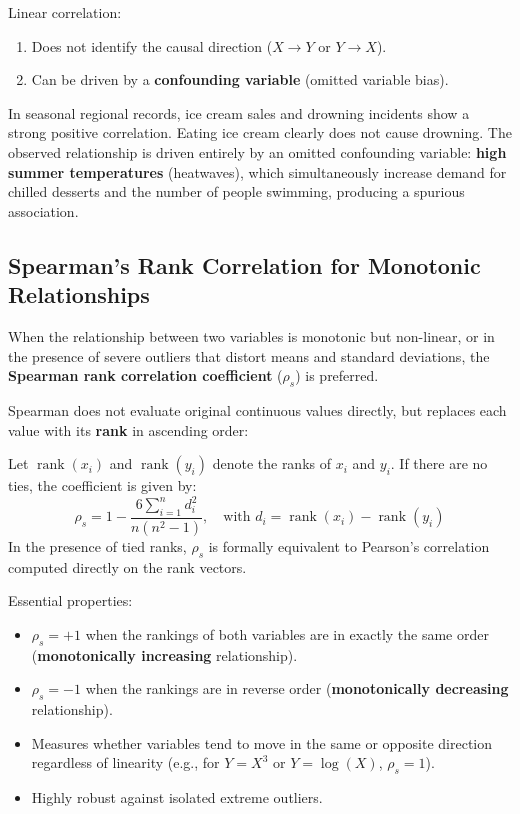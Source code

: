 Linear correlation:
\begin{enumerate}
    \item Does not identify the causal direction ($X \to Y$ or $Y \to X$).
    \item Can be driven by a \textbf{confounding variable} (omitted variable bias).
\end{enumerate}

\begin{example}
In seasonal regional records, ice cream sales and drowning incidents show a strong positive correlation. Eating ice cream clearly does not cause drowning. The observed relationship is driven entirely by an omitted confounding variable: \textbf{high summer temperatures} (heatwaves), which simultaneously increase demand for chilled desserts and the number of people swimming, producing a spurious association.
\end{example}

\subsection{Spearman's Rank Correlation for Monotonic Relationships}
When the relationship between two variables is monotonic but non-linear, or in the presence of severe outliers that distort means and standard deviations, the \textbf{Spearman rank correlation coefficient} ($\rho_s$) is preferred.

Spearman does not evaluate original continuous values directly, but replaces each value with its \textbf{rank} in ascending order:

\begin{definition}
Let $\operatorname{rank}(x_i)$ and $\operatorname{rank}(y_i)$ denote the ranks of $x_i$ and $y_i$. If there are no ties, the coefficient is given by:
\begin{equation}
\rho_s = 1 - \frac{6 \sum_{i=1}^n d_i^2}{n(n^2 - 1)}, \quad \text{with } d_i = \operatorname{rank}(x_i) - \operatorname{rank}(y_i)
\end{equation}
In the presence of tied ranks, $\rho_s$ is formally equivalent to Pearson's correlation computed directly on the rank vectors.
\end{definition}

Essential properties:
\begin{itemize}
    \item $\rho_s = +1$ when the rankings of both variables are in exactly the same order (\textbf{monotonically increasing} relationship).
    \item $\rho_s = -1$ when the rankings are in reverse order (\textbf{monotonically decreasing} relationship).
    \item Measures whether variables tend to move in the same or opposite direction regardless of linearity (e.g., for $Y = X^3$ or $Y = \log(X)$, $\rho_s = 1$).
    \item Highly robust against isolated extreme outliers.
\end{itemize}

